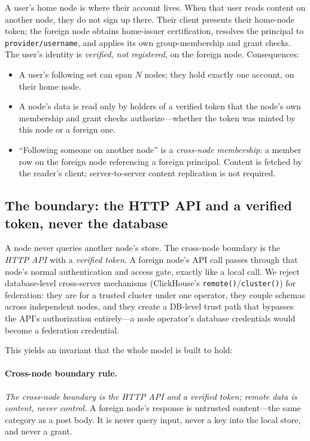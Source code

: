 \documentclass[sigconf, nonacm]{acmart}
\begin{document}
A user's home node is where their account lives. When that user reads content
on another node, they do not sign up there. Their client presents their
home-node token; the foreign node obtains home-issuer certification, resolves the
principal to \texttt{provider/username}, and applies its own group-membership
and grant checks. The user's identity is \emph{verified, not registered}, on
the foreign node. Consequences:

\begin{itemize}[leftmargin=*,nosep]
  \item A user's following set can span $N$ nodes; they hold exactly one
  account, on their home node.
  \item A node's data is read only by holders of a verified token that the
  node's own membership and grant checks authorize---whether the token was
  minted by this node or a foreign one.
  \item ``Following someone on another node'' is a \emph{cross-node
  membership}: a member row on the foreign node referencing a foreign
  principal. Content is fetched by the reader's client; server-to-server
  content replication is not required.
\end{itemize}

\subsection{The boundary: the HTTP API and a verified token, never the database}

A node never queries another node's store. The cross-node boundary is the
\emph{HTTP API} with a \emph{verified token}. A foreign node's API call passes
through that node's normal authentication and access gate, exactly like a local
call. We reject database-level cross-server mechanisms (ClickHouse's
\texttt{remote()}/\texttt{cluster()}) for federation: they are for a trusted
cluster under one operator, they couple schemas across independent nodes, and
they create a DB-level trust path that bypasses the API's authorization
entirely---a node operator's database credentials would become a federation
credential.

This yields an invariant that the whole model is built to hold:

\paragraph{Cross-node boundary rule.} \emph{The cross-node boundary is the HTTP API and a verified
token; remote data is content, never control.} A foreign node's response is
untrusted content---the same category as a post body. It is never query input,
never a key into the local store, and never a grant.
\end{document}
